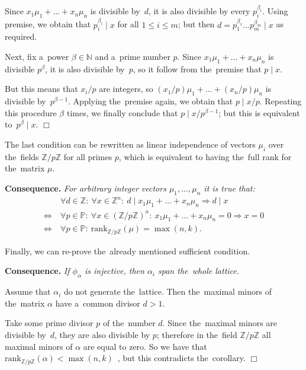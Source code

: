 \documentclass[twoside]{article}
\begin{document}
    Since $x_1 \mu_1 + \ldots + x_n \mu_n$ is divisible by~$d$, it is also divisible by every $p_i^{\beta_i}$.
    Using premise, we obtain that $p_i^{\beta_i} \mid x$ for all $1 \leq i \leq m$; but then
    $d = p_1^{\beta_1} \ldots p_m^{\beta_m} \mid x$ as required.

    Next, fix a~power $\beta \in \mathbb{N}$ and a~prime number $p$.
    Since $x_1 \mu_1 + \ldots + x_n \mu_n$ is divisible $p^\beta$,
    it is also divisible by~$p$, so it follow from the~premise that $p \mid x$.

    But this means that $x_i / p$ are integers, so $(x_1 / p) \mu_1 + \ldots + (x_n / p) \mu_n$ is divisible by~$p^{\beta - 1}$.
    Applying the~premise again, we obtain that $p \mid x / p$. Repeating this procedure $\beta$ times, we finally conclude
    that $p \mid x / p^{\beta - 1}$; but this is equivalent to~$p^\beta \mid x$.
\hfill$\Box$\medskip

The last condition can be rewritten as linear independence of vectors $\mu_i$ over the~fields $\mathbb{Z} / p\mathbb{Z}$
for all primes $p$, which is equivalent to having the~full rank for the~matrix $\mu$.

\medskip\noindent\textbf{Consequence.}\emph{
    For arbitrary integer vectors $\mu_1, \ldots, \mu_n$ it is true that:
    \begin{align*}
                         & \forall d \in \mathbb{Z}{:}\ \forall x \in \mathbb{Z}^n{:}\ d \mid x_1 \mu_1 + \ldots + x_n \mu_n \Rightarrow d \mid x \\
        \Leftrightarrow\ & \forall p \in \mathbb{P}{:}\ \forall x \in (\mathbb{Z} / p\mathbb{Z})^n{:}\ x_1 \mu_1 + \ldots + x_n \mu_n = 0 \Rightarrow x = 0 \\
        \Leftrightarrow\ & \forall p \in \mathbb{P}{:}\ \mathrm{rank}_{\mathbb{Z} / p \mathbb{Z}}(\mu) = \max(n, k).
    \end{align*}
}

Finally, we can re-prove the~already mentioned sufficient condition.

\medskip\noindent\textbf{Consequence.}\emph{
    If $\phi_\alpha$ is injective, then $\alpha_i$ span the~whole lattice.
}\medskip

    Assume that $\alpha_i$ do not generate the~lattice. Then the~maximal minors of the~matrix $\alpha$ have a~common divisor $d > 1$.

    Take some prime divisor $p$ of the~number $d$. Since the~maximal minors are divisible by~$d$, they are also divisible by $p$;
    therefore in the~field $\mathbb{Z} / p \mathbb{Z}$ all maximal minors of $\alpha$ are equal to zero.
    So we have that $\mathrm{rank}_{\mathbb{Z} / p \mathbb{Z}}(\alpha) < \max(n, k)$~\cite{Brbk70},
    but this contradicts the~corollary.
\hfill$\Box$
\end{document}
